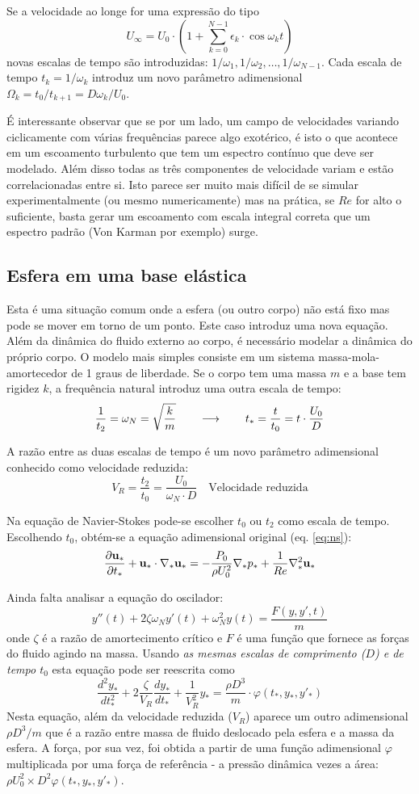 Se a velocidade ao longe for uma expressão do tipo 
\[
U_\infty = U_0\cdot\left(1 + \sum_{k=0}^{N-1}\epsilon_k\cdot\cos \omega_k t\right)
\]
novas escalas de tempo são introduzidas: $1/\omega_1, 1/\omega_2, \ldots, 1/\omega_{N-1}$. Cada escala de tempo $t_k = 1/\omega_k$ introduz um novo parâmetro adimensional $\Omega_k = t_0/t_{k+1} = D\omega_k/U_0$.

É interessante observar que se por um lado, um campo de velocidades variando ciclicamente com várias frequências parece algo exotérico, é isto o que acontece em um escoamento turbulento que tem um espectro contínuo que deve ser modelado. Além disso todas as três componentes de velocidade variam e estão correlacionadas entre si. Isto parece ser muito mais difícil de se simular experimentalmente (ou mesmo numericamente) mas na prática, se $Re$ for alto o suficiente, basta gerar um escoamento com escala integral correta que um espectro padrão (Von Karman por exemplo) surge.

\subsection{Esfera em uma base elástica}
Esta é uma situação comum onde a esfera (ou outro corpo) não está fixo mas pode se mover em torno de um ponto. Este caso introduz uma nova equação. Além da dinâmica do fluido externo ao corpo, é necessário modelar a dinâmica do próprio corpo. O modelo mais simples consiste em um sistema massa-mola-amortecedor de 1 graus de liberdade. Se o corpo tem uma massa $m$ e a base tem rigidez $k$, a frequência natural introduz uma outra escala de tempo:
\[
\frac{1}{t_2}  = \omega_N = \sqrt{\frac{k}{m}} \qquad\longrightarrow\qquad t_* = \frac{t}{t_0} = t\cdot \frac{U_0}{D}
\]

A razão entre as duas escalas de tempo é um novo parâmetro adimensional conhecido como velocidade reduzida:
\[
V_R = \frac{t_2}{t_0} = \frac{U_0}{\omega_N\cdot D} \quad \text{Velocidade reduzida}
\]

 Na equação de Navier-Stokes pode-se escolher $t_0$ ou $t_2$ como escala de tempo. Escolhendo $t_0$, obtém-se a equação adimensional original (eq. \ref{eq:ns}):
\[
\frac{\partial \mathbf{u}_*}{\partial t_*} +  \mathbf{u}_*\cdot\nabla_* \mathbf{u_*} = -\frac{P_0}{\rho U_0^2}\nabla_* p_* + \frac{1}{Re}\nabla_*^2 \mathbf{u}_* 
\]

Ainda falta analisar a equação do oscilador:
\[
y''(t) + 2\zeta\omega_Ny'(t) + \omega_N^2y(t) = \frac{F(y, y', t)}{m}
\]
onde $\zeta$ é a razão de amortecimento crítico e $F$ é uma função que fornece as forças do fluido agindo na massa. Usando \emph{as mesmas escalas de comprimento ($D$) e de tempo $t_0$} esta equação pode ser reescrita como
\[
\frac{d^2y_*}{dt_*^2} + 2\frac{\zeta}{V_R} \frac{dy_*}{dt_*} + \frac{1}{V_R^2} y_* = \frac{\rho D^3}{m} \cdot \varphi\left(t_*, y_*, y'_*\right)
\]
Nesta equação, além da velocidade reduzida ($V_R$) aparece um outro adimensional $\rho D^3/m$ que é a razão entre massa de fluido deslocado pela esfera e a massa da esfera. A força, por sua vez, foi obtida a partir de uma função adimensional $\varphi$ multiplicada por uma força de referência - a pressão dinâmica vezes a área: $\rho U_0^2 \times D^2 \varphi(t_*, y_*, y'_*)$.

